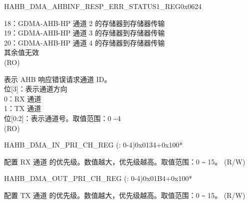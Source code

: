 \begin{register}{H}{AHB\_DMA\_AHBINF\_RESP\_ERR\_STATUS1\_REG}{0x0624}
\begin{regdesc}
\begin{reglist}
18：GDMA-AHB-HP 通道 2 的存储器到存储器传输\\
19：GDMA-AHB-HP 通道 3 的存储器到存储器传输\\
20：GDMA-AHB-HP 通道 4 的存储器到存储器传输\\
其余值无效\\ (RO)
\label{fielddesc:AHBDMAAHBINFRESPERRCHID}\item [AHB\_DMA\_AHBINF\_RESP\_ERR\_CH\_ID] 表示 AHB 响应错误请求通道 ID。\\
位[3]：表示通道方向\\
0：RX 通道\\
1：TX 通道\\
位[0:2]：表示通道号。取值范围：0 \textasciitilde 4\\ (RO)
\end{reglist}\end{regdesc}
\end{register}


\begin{register}{H}{AHB\_DMA\_IN\_PRI\_CH\_REG (: 0-4)}{0x0134+0x100*}\label{regdesc:AHBDMAINPRICHNREG}
%
%
\regnewline%
\begin{regdesc}\begin{reglist}
\label{fielddesc:AHBDMARXPRICHN}\item [AHB\_DMA\_RX\_PRI\_CH\regindex{n}] 配置 RX 通道  的优先级。数值越大，优先级越高。取值范围：0 \verb+~+ 15。 (R/W)
\end{reglist}\end{regdesc}
\end{register}


\begin{register}{H}{AHB\_DMA\_OUT\_PRI\_CH\_REG (: 0-4)}{0x01B4+0x100*}\label{regdesc:AHBDMAOUTPRICHNREG}
%
%
\regnewline%
\begin{regdesc}\begin{reglist}
\label{fielddesc:AHBDMATXPRICHN}\item [AHB\_DMA\_TX\_PRI\_CH\regindex{n}] 配置 TX 通道  的优先级。数值越大，优先级越高。取值范围：0 \verb+~+ 15。 (R/W)
\end{reglist}\end{regdesc}
\end{register}



